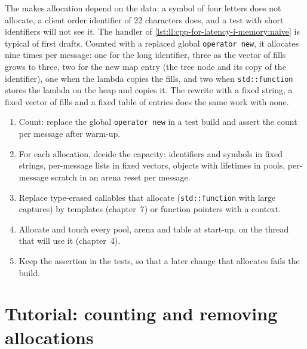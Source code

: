 The  makes allocation depend on the data: a symbol of four letters does not allocate, a client
order identifier of 22 characters does, and a test with short identifiers will not see it. The handler of
\cref{lst:ll:cpp-for-latency-i-memory:naive} is typical of first drafts. Counted with a replaced global \texttt{operator
new}, it allocates nine times per message: one for the long identifier, three as the vector of fills grows to three, two
for the new map entry (the tree node and its copy of the identifier), one when the lambda copies the fills, and two when
\texttt{std::function} stores the lambda on the heap and copies it. The rewrite with a fixed string, a fixed vector of
fills and a fixed table of entries does the same work with none.

\begin{method}\label{met:ll:cpp-for-latency-i-memory:remove}
\begin{enumerate}
\item Count: replace the global \texttt{operator new} in a test build and assert the count per message after warm-up.
\item For each allocation, decide the capacity: identifiers and symbols in fixed strings, per-message lists in fixed
vectors, objects with lifetimes in pools, per-message scratch in an arena reset per message.
\item Replace type-erased callables that allocate (\texttt{std::function} with large captures) by templates (chapter~7) or
function pointers with a context.
\item Allocate and touch every pool, arena and table at start-up, on the thread that will use it (chapter~4).
\item Keep the assertion in the tests, so that a later change that allocates fails the build.
\end{enumerate}
\end{method}

\section{Tutorial: counting and removing allocations}\label{tut:ll:cpp-for-latency-i-memory:tut}

